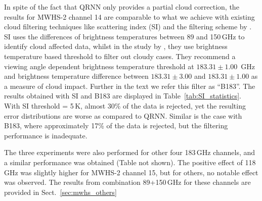\documentclass[amt, manuscript]{copernicus}
\begin{document}
In spite of the fact that QRNN only provides a partial cloud correction, the results for  MWHS-2 channel 14 are comparable to what we achieve with existing cloud filtering techniques like scattering index (SI)  \citep{geer2015scatteringindex} and the filtering scheme by \citet{buehler:aclou:07}. SI uses the differences of brightness temperatures between 89 and 150\,GHz to identify cloud affected data, whilst in the study by \citet{buehler:aclou:07}, they use brightness temperature based threshold to filter out cloudy cases. They recommend a viewing angle dependent brightness temperature threshold at $183.31\pm1.00$ \,GHz and brightness temperature difference between $183.31\pm3.00$ and $183.31\pm 1.00$ as a measure of cloud impact. Further in the text we refer this filter as ``B183''. The results obtained with SI and B183 are displayed in Table~\ref{tab:SI_statistics}. 
With SI threshold = 5\,K, almost 30\% of the data is rejected, yet the resulting error distributions are worse as compared to QRNN. Similar is the case with B183, where approximately 17\% of the data is rejected, but the filtering performance is inadequate.

The three experiments were also performed for other four 183\,GHz channels, and a similar performance was obtained (Table not shown). The positive effect of 118\,GHz was slightly higher for MWHS-2 channel 15, but for others, no notable effect was observed. The results from combination 89+150\,GHz for these channels are provided in Sect.~\ref{sec:mwhs_others} 
\end{document}
